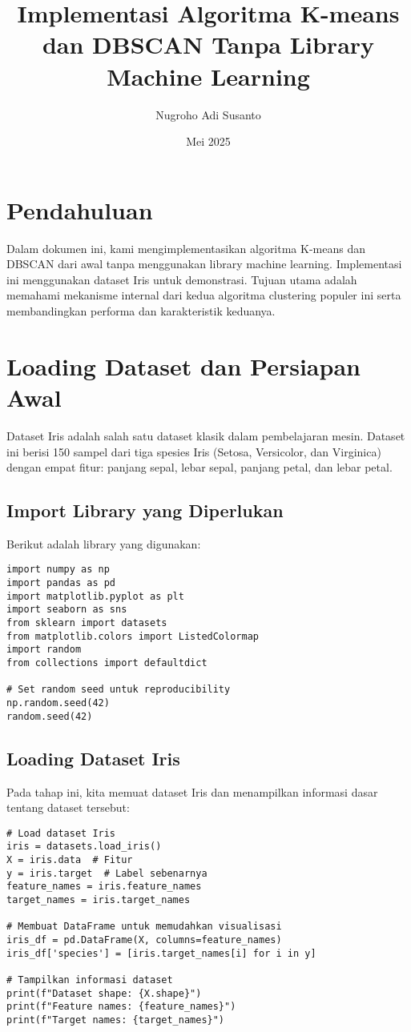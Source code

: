 \documentclass[a4paper,12pt]{article}
\title{Implementasi Algoritma K-means dan DBSCAN Tanpa Library Machine Learning}
\author{Nugroho Adi Susanto}
\date{Mei 2025}
\begin{document}
\maketitle
\tableofcontents
\newpage

\section{Pendahuluan}
Dalam dokumen ini, kami mengimplementasikan algoritma K-means dan DBSCAN dari awal tanpa menggunakan library machine learning. Implementasi ini menggunakan dataset Iris untuk demonstrasi. Tujuan utama adalah memahami mekanisme internal dari kedua algoritma clustering populer ini serta membandingkan performa dan karakteristik keduanya.

\section{Loading Dataset dan Persiapan Awal}
Dataset Iris adalah salah satu dataset klasik dalam pembelajaran mesin. Dataset ini berisi 150 sampel dari tiga spesies Iris (Setosa, Versicolor, dan Virginica) dengan empat fitur: panjang sepal, lebar sepal, panjang petal, dan lebar petal.

\subsection{Import Library yang Diperlukan}
Berikut adalah library yang digunakan:
\begin{lstlisting}
import numpy as np
import pandas as pd
import matplotlib.pyplot as plt
import seaborn as sns
from sklearn import datasets
from matplotlib.colors import ListedColormap
import random
from collections import defaultdict

# Set random seed untuk reproducibility
np.random.seed(42)
random.seed(42)
\end{lstlisting}

\subsection{Loading Dataset Iris}
Pada tahap ini, kita memuat dataset Iris dan menampilkan informasi dasar tentang dataset tersebut:
\begin{lstlisting}
# Load dataset Iris
iris = datasets.load_iris()
X = iris.data  # Fitur
y = iris.target  # Label sebenarnya
feature_names = iris.feature_names
target_names = iris.target_names

# Membuat DataFrame untuk memudahkan visualisasi
iris_df = pd.DataFrame(X, columns=feature_names)
iris_df['species'] = [iris.target_names[i] for i in y]

# Tampilkan informasi dataset
print(f"Dataset shape: {X.shape}")
print(f"Feature names: {feature_names}")
print(f"Target names: {target_names}")
\end{lstlisting}
\end{document}
